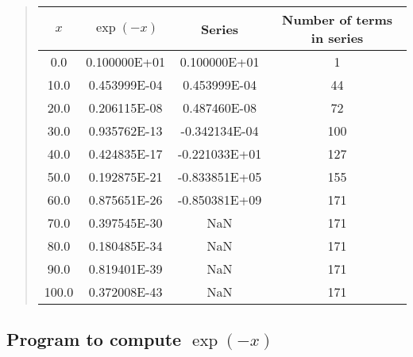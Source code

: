 \documentclass[%
twoside,                 %
final,                   %
10pt]{article}
\newenvironment{block_mdfboxadmon}[1][]{
\begin{block_mdfboxmdframed}[frametitle=#1]
}
{
\end{block_mdfboxmdframed}
}
\begin{document}
\begin{block_mdfboxadmon}


\begin{quote}
\begin{tabular}{cccc}
\hline
\multicolumn{1}{c}{ $x$ } & \multicolumn{1}{c}{ $\exp{(-x)}$ } & \multicolumn{1}{c}{ Series } & \multicolumn{1}{c}{ Number of terms in series } \\
\hline
0.0                       & 0.100000E+01              & 0.100000E+01              & 1                         \\
10.0                      & 0.453999E-04              & 0.453999E-04              & 44                        \\
20.0                      & 0.206115E-08              & 0.487460E-08              & 72                        \\
30.0                      & 0.935762E-13              & -0.342134E-04             & 100                       \\
40.0                      & 0.424835E-17              & -0.221033E+01             & 127                       \\
50.0                      & 0.192875E-21              & -0.833851E+05             & 155                       \\
60.0                      & 0.875651E-26              & -0.850381E+09             & 171                       \\
70.0                      & 0.397545E-30              & NaN                       & 171                       \\
80.0                      & 0.180485E-34              & NaN                       & 171                       \\
90.0                      & 0.819401E-39              & NaN                       & 171                       \\
100.0                     & 0.372008E-43              & NaN                       & 171                       \\
\hline
\end{tabular}
\end{quote}

\noindent
\end{block_mdfboxadmon}




\subsection{Program to compute $\exp{(-x)}$}
\end{document}

